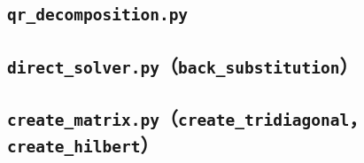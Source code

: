 \documentclass[10pt, a4paper]{article}
\begin{document}
\subsection{\texttt{qr\_decomposition.py}}


\subsection{\texttt{direct\_solver.py}（\texttt{back\_substitution}）}



\subsection{\texttt{create\_matrix.py}（\texttt{create\_tridiagonal}，\texttt{create\_hilbert}）}

\end{document}
